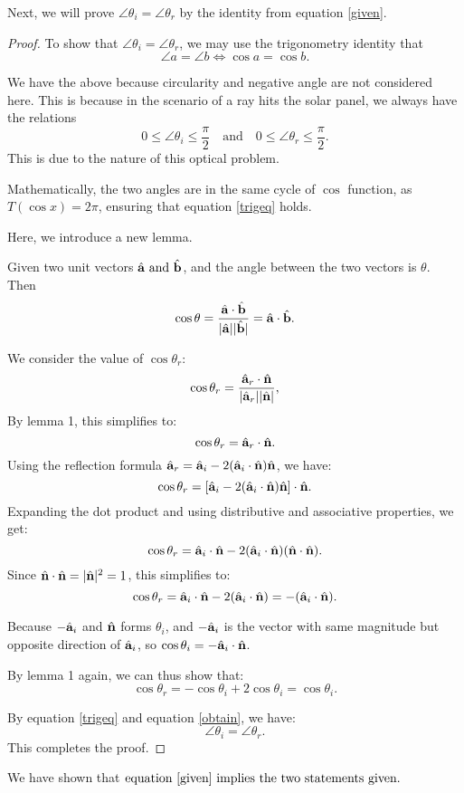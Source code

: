 \documentclass[12pt,a4paper]{article}
\begin{document}
    
    Next, we will prove $\angle \theta_i=\angle \theta_r$ by the identity from equation \ref{given}.
    \begin{proof}
        To show that $\angle \theta_i=\angle \theta_r$, we may use the trigonometry identity that
        \begin{equation}\label{trigeq}
            \angle a=\angle b \iff \cos{a} = \cos{b}.
        \end{equation}
        \begin{remark}
            We have the above because circularity and negative angle are not considered here. This is because in the scenario of a ray hits the solar panel, we always have the relations 
            $$0 \leq \angle \theta_i \leq \frac{\pi}{2} \quad \text{and} \quad 0 \leq \angle \theta_r \leq \frac{\pi}{2}.$$
            This is due to the nature of this optical problem.
            
            Mathematically, the two angles are in the same cycle of $\cos$ function, as $T(\cos{x}) = 2 \pi$, ensuring that equation \ref{trigeq} holds.
        \end{remark}
        
    Here, we introduce a new lemma.
    \begin{lemma}
    Given two unit vectors $\hat{\mathbf{a}}\text{ and }\hat{\mathbf{b}}$, and the angle between the two vectors is $\theta$. Then
    $$\cos{\theta} = \frac{\hat{\mathbf{a}}\cdot \hat{\mathbf{b}}}{|\hat{\mathbf{a}}||\hat{\mathbf{b}}|} = \hat{\mathbf{a}}\cdot \hat{\mathbf{b}}.
    $$ 
    \end{lemma}
We consider the value of \(\cos \theta_r\):
\[
\cos \theta_r = \frac{\hat{\mathbf{a}}_r \cdot \hat{\mathbf{n}}}{|\hat{\mathbf{a}}_r||\hat{\mathbf{n}}|},
\]
By lemma 1, this simplifies to:
\[
\cos \theta_r = \hat{\mathbf{a}}_r \cdot \hat{\mathbf{n}}.
\]
Using the reflection formula \(\hat{\mathbf{a}}_r = \hat{\mathbf{a}}_i - 2 (\hat{\mathbf{a}}_i \cdot \hat{\mathbf{n}}) \hat{\mathbf{n}}\), we have:
\[
\cos \theta_r = [\hat{\mathbf{a}}_i - 2 (\hat{\mathbf{a}}_i \cdot \hat{\mathbf{n}}) \hat{\mathbf{n}}] \cdot \hat{\mathbf{n}}.
\]
Expanding the dot product and using distributive and associative properties, we get:
\[
\cos \theta_r = \hat{\mathbf{a}}_i \cdot \hat{\mathbf{n}} - 2 (\hat{\mathbf{a}}_i \cdot \hat{\mathbf{n}}) (\hat{\mathbf{n}} \cdot \hat{\mathbf{n}}).
\]
Since \(\hat{\mathbf{n}} \cdot \hat{\mathbf{n}} = |\hat{\mathbf{n}}|^2 = 1\), this simplifies to:
\[
\cos \theta_r = \hat{\mathbf{a}}_i \cdot \hat{\mathbf{n}} - 2 (\hat{\mathbf{a}}_i \cdot \hat{\mathbf{n}}) = -(\hat{\mathbf{a}}_i \cdot \hat{\mathbf{n}}).
\]

Because $-\hat{\mathbf{a}}_i$ and $\hat{\mathbf{n}}$ forms \(\theta_i\), and $-\hat{\mathbf{a}}_i$ is the vector with same magnitude but opposite direction of $\hat{\mathbf{a}}_i$, so \(\cos \theta_i = -\hat{\mathbf{a}}_i \cdot \hat{\mathbf{n}}\).

By lemma 1 again, we can thus show that:
\begin{equation}\label{obtain}
\cos \theta_r = -\cos \theta_i + 2\cos \theta_i = \cos \theta_i.
\end{equation}

By equation \ref{trigeq} and equation \ref{obtain}, we have:
\[
\angle \theta_i = \angle \theta_r.
\]
This completes the proof.
\end{proof}
We have shown that  $\text{equation \ref{given} }\text{implies the two statements given.}$
\end{document}
